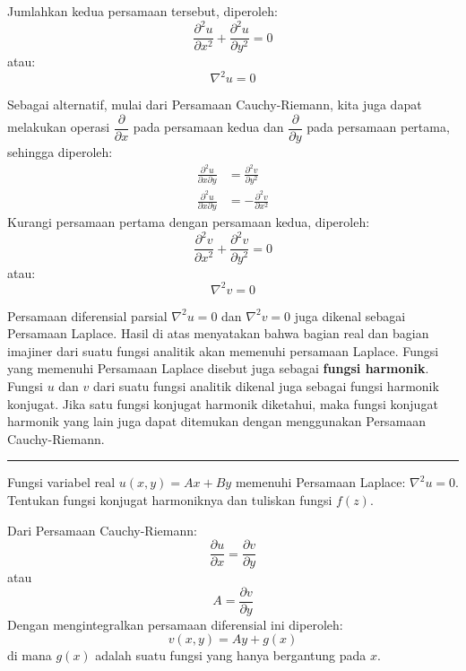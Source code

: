 Jumlahkan kedua persamaan tersebut, diperoleh:
\begin{equation*}
\frac{\partial^{2}u}{\partial x^{2}}+\frac{\partial^{2}u}{\partial y^{2}}=0
\end{equation*}
atau:
\begin{equation}
\nabla^{2} u = 0    
\end{equation}

Sebagai alternatif, mulai dari Persamaan Cauchy-Riemann, kita juga
dapat melakukan operasi $\dfrac{\partial}{\partial x}$ pada persamaan
kedua dan $\dfrac{\partial}{\partial y}$ pada persamaan pertama,
sehingga diperoleh:
\begin{align*}
\frac{\partial^{2}u}{\partial x\partial y} &= \frac{\partial^{2}v}{\partial y^{2}} \\
\frac{\partial^{2}u}{\partial x\partial y} &= -\frac{\partial^{2}v}{\partial x^{2}}
\end{align*}
%
Kurangi persamaan pertama dengan persamaan kedua, diperoleh:
\begin{equation*}
\frac{\partial^{2}v}{\partial x^{2}}+\frac{\partial^{2}v}{\partial y^{2}}=0    
\end{equation*}
atau:
\begin{equation}
\nabla^{2}v=0    
\end{equation}

Persamaan diferensial parsial $\nabla^{2}u=0$ dan $\nabla^{2}v=0$
juga dikenal sebagai Persamaan Laplace. Hasil di atas menyatakan bahwa
bagian real dan bagian imajiner dari suatu fungsi analitik akan memenuhi
persamaan Laplace. Fungsi yang memenuhi Persamaan Laplace disebut
juga sebagai \textbf{fungsi harmonik}. Fungsi $u$ dan $v$ dari suatu
fungsi analitik dikenal juga sebagai fungsi harmonik konjugat. Jika
satu fungsi konjugat harmonik diketahui, maka fungsi konjugat harmonik
yang lain juga dapat ditemukan dengan menggunakan Persamaan Cauchy-Riemann.

\rule[0.5ex]{1\columnwidth}{1pt}

{\color{blue}
Fungsi variabel real $u(x,y)=Ax+By$ memenuhi Persamaan Laplace: $\nabla^{2}u=0$.
Tentukan fungsi konjugat harmoniknya dan tuliskan fungsi $f(z)$.
}

Dari Persamaan Cauchy-Riemann:
\begin{equation*}
\frac{\partial u}{\partial x}=\frac{\partial v}{\partial y}
\end{equation*}
atau
\begin{equation*}
A = \frac{\partial v}{\partial y}
\end{equation*}
Dengan mengintegralkan persamaan diferensial ini diperoleh:
\begin{equation*}
v(x,y)=Ay+g(x)
\end{equation*}
di mana $g(x)$ adalah suatu fungsi yang hanya bergantung pada $x$.

